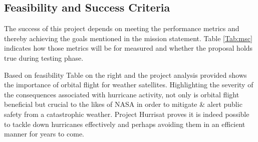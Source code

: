 \subsection{Feasibility and Success Criteria }
The success of this project depends on meeting the performance metrics and thereby achieving the goals mentioned in the mission statement. Table \ref{Tab:msc} indicates how those metrics will be for measured and whether the proposal holds true  during testing phase.

Based on feasibility Table on the right and the project analysis provided shows the importance of orbital flight for weather satellites. 
Highlighting  the severity of the consequences associated with hurricane activity, not only is orbital flight beneficial but crucial to the likes of NASA in order to  mitigate & alert public safety from a catastrophic weather. Project Hurrisat proves it is indeed possible to tackle down hurricanes effectively and perhaps avoiding them in an efficient manner for years to come.  \\
